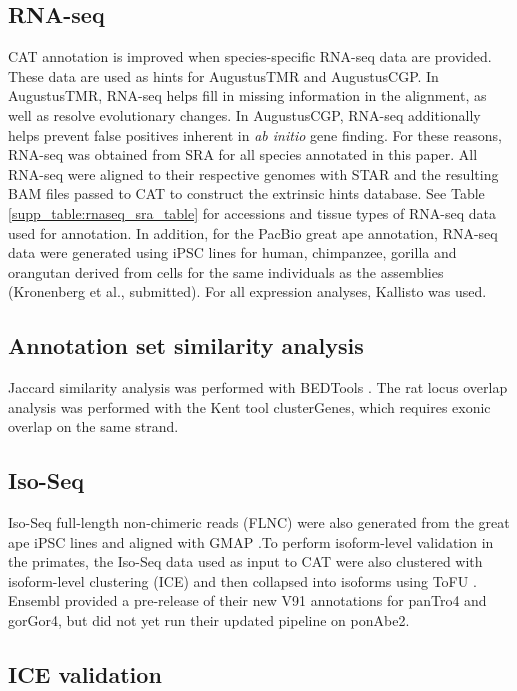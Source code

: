 \documentclass[fleqn,10pt]{wlscirep}
\begin{document}
\subsection*{RNA-seq}

CAT annotation is improved when species-specific RNA-seq data are provided. These data are used as hints for AugustusTMR and AugustusCGP. In AugustusTMR, RNA-seq helps fill in missing information in the alignment, as well as resolve evolutionary changes. In AugustusCGP, RNA-seq additionally helps prevent false positives inherent in \textit{ab initio} gene finding. For these reasons, RNA-seq was obtained from SRA for all species annotated in this paper. All RNA-seq were aligned to their respective genomes with STAR \cite{dobin2013star} and the resulting BAM files passed to CAT to construct the extrinsic hints database. See Table \ref{supp_table:rnaseq_sra_table} for accessions and tissue types of RNA-seq data used for annotation. In addition, for the PacBio great ape annotation, RNA-seq data were generated using iPSC lines for human, chimpanzee, gorilla and orangutan derived from cells for the same individuals as the assemblies (Kronenberg et al., submitted). For all expression analyses, Kallisto \cite{bray2015near} was used.

\subsection*{Annotation set similarity analysis}

Jaccard similarity analysis was performed with BEDTools \cite{quinlan2010bedtools}. The rat locus overlap analysis was performed with the Kent tool clusterGenes, which requires exonic overlap on the same strand.

\subsection*{Iso-Seq}

Iso-Seq full-length non-chimeric reads (FLNC) were also generated from the great ape iPSC lines and aligned with GMAP \cite{wu2005gmap}.To perform isoform-level validation in the primates, the Iso-Seq data used as input to CAT were also clustered with isoform-level clustering (ICE) and then collapsed into isoforms using ToFU \cite{gordon2015widespread}. Ensembl provided a pre-release of their new V91 annotations for panTro4 and gorGor4, but did not yet run their updated pipeline on ponAbe2.

\subsection*{ICE validation}
\end{document}
